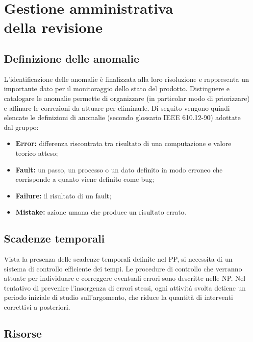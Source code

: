 \documentclass[openany,12pt,a4paper]{report}
\begin{document}

\chapter{Gestione amministrativa \\ della revisione}

\section{Definizione delle anomalie}

L’identificazione delle anomalie è finalizzata alla loro risoluzione e rappresenta un importante dato per il monitoraggio dello stato del prodotto. Distinguere e catalogare le anomalie permette di organizzare (in particolar modo di priorizzare) e affinare le correzioni da attuare per eliminarle. Di seguito
vengono quindi elencate le definizioni di anomalie (secondo glossario IEEE 610.12-90) adottate dal gruppo:

\begin{itemize}
    \item \textbf{Error:} differenza riscontrata tra risultato di una computazione e valore teorico atteso;
    \item \textbf{Fault:} un passo, un processo o un dato definito in modo erroneo che corrisponde a quanto viene definito come bug;
    \item \textbf{Failure:} il risultato di un fault;
    \item \textbf{Mistake:} azione umana che produce un risultato errato.
\end{itemize}

\section{Scadenze temporali}

Vista la presenza delle scadenze temporali definite nel PP, si necessita di un sistema di controllo efficiente dei tempi. Le procedure di controllo che verranno attuate per individuare e correggere eventuali errori sono descritte
nelle NP. Nel tentativo di prevenire l'insorgenza di errori stessi, ogni attività svolta detiene un periodo iniziale di
studio sull'argomento, che riduce la quantità di interventi correttivi a posteriori.

\section{Risorse}
\end{document}
